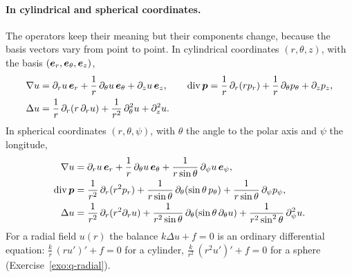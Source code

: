 \paragraph{In cylindrical and spherical coordinates.}
%
The operators keep their meaning but their components change, because the
basis vectors vary from point to point. In cylindrical coordinates
$(r,\theta,z)$, with the basis $(\bm{e}_r,\bm{e}_\theta,\bm{e}_z)$,
\begin{align*}
  \nabla u&=\partial_ru\,\bm{e}_r+\frac1r\,\partial_\theta u\,\bm{e}_\theta+\partial_zu\,\bm{e}_z,\qquad
  \operatorname{div}\bm{p}=\frac1r\,\partial_r(rp_r)+\frac1r\,\partial_\theta p_\theta+\partial_zp_z,\\
  \Delta u&=\frac1r\,\partial_r(r\,\partial_ru)+\frac1{r^2}\,\partial^2_\theta u+\partial^2_zu .
\end{align*}
In spherical coordinates $(r,\theta,\psi)$, with $\theta$ the angle to the
polar axis and $\psi$ the longitude,
\begin{align*}
  \nabla u&=\partial_ru\,\bm{e}_r+\frac1r\,\partial_\theta u\,\bm{e}_\theta
  +\frac1{r\sin\theta}\,\partial_\psi u\,\bm{e}_\psi,\\
  \operatorname{div}\bm{p}&=\frac1{r^2}\,\partial_r(r^2p_r)+\frac1{r\sin\theta}\,\partial_\theta(\sin\theta\,p_\theta)
  +\frac1{r\sin\theta}\,\partial_\psi p_\psi,\\
  \Delta u&=\frac1{r^2}\,\partial_r(r^2\partial_ru)+\frac1{r^2\sin\theta}\,\partial_\theta(\sin\theta\,\partial_\theta u)
  +\frac1{r^2\sin^2\theta}\,\partial^2_\psi u .
\end{align*}
For a radial field $u(r)$ the balance $k\Delta u+f=0$ is an ordinary
differential equation: $\displaystyle \frac kr\,(ru')'+f=0$ for a cylinder,
$\displaystyle \frac k{r^2}\,(r^2u')'+f=0$ for a sphere (Exercise~\ref{exo:q-radial}).

